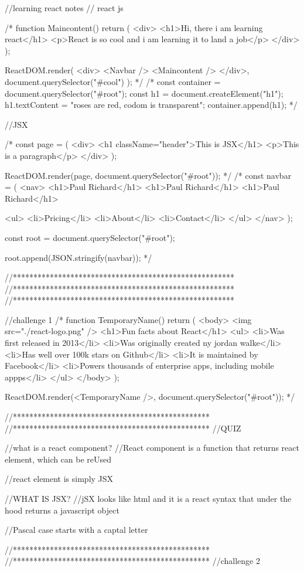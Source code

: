 //learning react notes
// react js

/* function Maincontent() {
  return (
    <div>
      <h1>Hi, there i am learning react</h1>
      <p>React is so cool and i am learning it to land a job</p>
    </div>
  );
}

ReactDOM.render(
  <div>
    <Navbar />
    <Maincontent />
  </div>,
  document.querySelector("#cool")
);
 */
/* 
const container = document.querySelector("#root");
const h1 = document.createElement("h1");
h1.textContent = "roses are red, codom is transparent";
container.append(h1); */

//JSX

/* const page = (
  <div>
    <h1 className="header">This is JSX</h1>
    <p>This is a paragraph</p>
  </div>
);

ReactDOM.render(page, document.querySelector("#root"));
 */
/* 
const navbar = (
  <nav>
    <h1>Paul Richard</h1>
    <h1>Paul Richard</h1>
    <h1>Paul Richard</h1>

    <ul>
      <li>Pricing</li>
      <li>About</li>
      <li>Contact</li>
    </ul>
  </nav>
);

const root = document.querySelector("#root");

root.append(JSON.stringify(navbar));
 */

//******************************************************
//******************************************************
//******************************************************

//challenge 1
/* 
function TemporaryName() {
  return (
    <body>
      <img src="./react-logo.png" />
      <h1>Fun facts about React</h1>
      <ul>
        <li>Was first released in 2013</li>
        <li>Was originally created ny jordan walke</li>
        <li>Has well over 100k stars on Github</li>
        <li>It is maintained by Facebook</li>
        <li>Powers thousands of enterprise apps, including mobile appps</li>
      </ul>
    </body>
  );
}

ReactDOM.render(<TemporaryName />, document.querySelector("#root"));
 */

//************************************************
//************************************************
//QUIZ

//what is a react component?
//React component is a function that returns react element, which can be reUsed

//react element is simply JSX

//WHAT IS JSX?
//jSX looks like html and it is a react syntax that under the hood returns a javascript object

//Pascal case starts with a captal letter

//************************************************
//************************************************
//challenge 2
